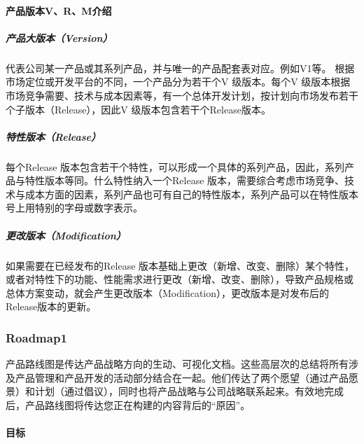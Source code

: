 \documentclass[letterpaper,10pt,english]{sphinxmanual}
\begin{document}
\paragraph{产品版本V、R、M介绍}
\label{\detokenize{chapter_project/product_document:vrm}}

\subparagraph{产品大版本（Version）}
\label{\detokenize{chapter_project/product_document:version}}
代表公司某一产品或其系列产品，并与唯一的产品配套表对应。例如V1等。
根据市场定位或开发平台的不同，一个产品分为若干个V 级版本。每个V
级版本根据市场竞争需要、技术与成本因素等，有一个总体开发计划，按计划向市场发布若干个子版本（Release），因此V
级版本包含若干个Release版本。


\subparagraph{特性版本（Release）}
\label{\detokenize{chapter_project/product_document:release}}
每个Release
版本包含若干个特性，可以形成一个具体的系列产品，因此，系列产品与特性版本等同。什么特性纳入一个Release
版本，需要综合考虑市场竞争、技术与成本方面的因素，系列产品也可有自己的特性版本，系列产品可以在特性版本号上用特别的字母或数字表示。


\subparagraph{更改版本（Modification）}
\label{\detokenize{chapter_project/product_document:modification}}
如果需要在已经发布的Release
版本基础上更改（新增、改变、删除）某个特性，或者对特性下的功能、性能需求进行更改（新增、改变、删除），导致产品规格或总体方案变动，就会产生更改版本（Modification），更改版本是对发布后的Release版本的更新。


\subsubsection{Roadmap1\sphinxfootnotemark[810]}
\label{\detokenize{chapter_project/Roadmap:roadmap1}}\label{\detokenize{chapter_project/Roadmap::doc}}%
\begin{footnotetext}[810]\sphinxAtStartFootnote
{}
%
\end{footnotetext}\ignorespaces 
产品路线图是传达产品战略方向的生动、可视化文档。这些高层次的总结将所有涉及产品管理和产品开发的活动部分结合在一起。他们传达了两个愿望（通过产品愿景）和计划（通过倡议），同时也将产品战略与公司战略联系起来。有效地完成后，产品路线图将传达您正在构建的内容背后的“原因”。


\paragraph{目标}
\label{\detokenize{chapter_project/Roadmap:id1}}
\end{document}
